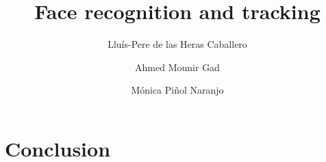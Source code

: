 \documentclass[12pt]{article}
\author{
	Llu\'{i}s-Pere de las Heras Caballero \and
	Ahmed Mounir Gad \and
	M\'onica Pi\~{n}ol Naranjo
}
\title{Face recognition and tracking}
\begin{document}
\maketitle
\thispagestyle{empty}
\newpage







\section{Conclusion}



\end{document}
